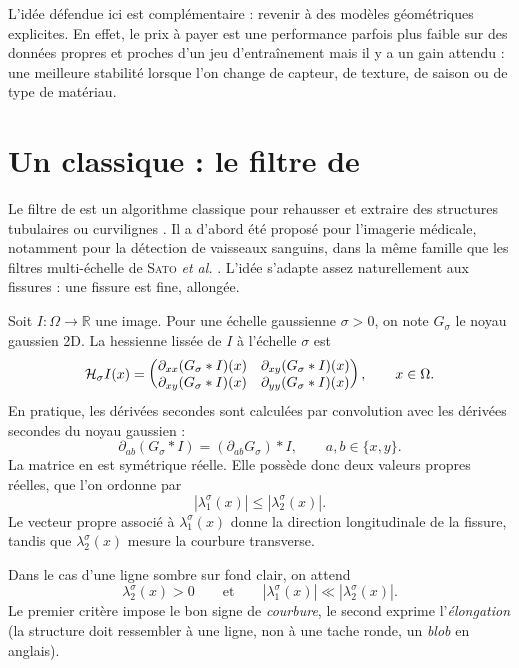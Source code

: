 L'idée défendue ici est complémentaire : revenir à des modèles géométriques explicites. 
En effet, le prix à payer est une performance parfois plus faible sur des données propres et proches d'un jeu d'entraînement mais il y a un gain attendu : une meilleure stabilité lorsque l'on change de capteur, de texture, de saison ou de type de matériau.

\section{Un classique : le filtre de \Frangi}
\label{sec:chapIII_frangi_classique}

Le filtre de \Frangi{} est un algorithme classique pour rehausser et extraire des structures tubulaires ou curvilignes \cite{Frangi1998}. Il a d'abord été proposé pour l'imagerie médicale, notamment pour la détection de vaisseaux sanguins, dans la même famille que les filtres multi-échelle de \textsc{Sato} \emph{et al.} \cite{Sato1998}. L'idée s'adapte assez naturellement aux fissures : une fissure est fine, allongée. %

Soit $I : \Omega \to \mathbb R$ une image. Pour une échelle gaussienne $\sigma>0$, on note $G_\sigma$ le noyau gaussien 2D. La hessienne lissée de $I$ à l'échelle $\sigma$ est
\begin{equation}
    \mathcal H_\sigma I(x)
    =
    \begin{pmatrix}
        \partial_{xx}(G_\sigma * I)(x) & \partial_{xy}(G_\sigma * I)(x) \\
        \partial_{xy}(G_\sigma * I)(x) & \partial_{yy}(G_\sigma * I)(x)
    \end{pmatrix},
    \qquad x\in\Omega.
    \label{eq:chapIII_hessienne}
\end{equation}
En pratique, les dérivées secondes sont calculées par convolution avec les dérivées secondes du noyau gaussien :
\[
    \partial_{ab}(G_\sigma * I) = (\partial_{ab}G_\sigma)*I,
    \qquad a,b\in\{x,y\}.
\]
La matrice en  est symétrique réelle. Elle possède donc deux valeurs propres réelles, que l'on ordonne par
\[
    |\lambda_1^\sigma(x)| \le |\lambda_2^\sigma(x)|.
\]
Le vecteur propre associé à $\lambda_1^\sigma(x)$ donne la direction longitudinale de la fissure, tandis que $\lambda_2^\sigma(x)$ mesure la courbure transverse.

Dans le cas d'une ligne sombre sur fond clair, on attend
\[
    \lambda_2^\sigma(x)>0
    \qquad\text{et}\qquad
    |\lambda_1^\sigma(x)| \ll |\lambda_2^\sigma(x)|.
\]
Le premier critère impose le bon signe de \emph{courbure}, le second exprime l'\emph{élongation} (la structure doit ressembler à une ligne, non à une tache ronde, un \emph{blob} en anglais).

